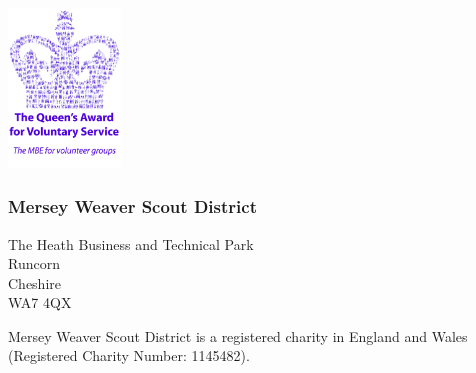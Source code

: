 \hfill\includegraphics[width=3cm]{../img/qafvs}\\

\subsubsection{Mersey Weaver Scout District}
The Heath Business and Technical Park\\
Runcorn\\
Cheshire\\
WA7 4QX\\

\vspace{2cm}

{\small Mersey Weaver Scout District is a registered charity in England and Wales (Registered Charity Number: 1145482).}